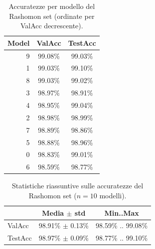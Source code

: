 \documentclass[12pt,a4paper,oneside]{report}
\numberwithin{figure}{chapter}
\numberwithin{table}{chapter}
\begin{document}
\begin{table}[H]
      \centering
      \begin{minipage}{0.90\linewidth}
            \centering
            \renewcommand{\arraystretch}{1.1}
            \setlength{\tabcolsep}{6pt}
            \begin{tabular}{rcc}
                  \hline
                  \textbf{Model} & \textbf{ValAcc} & \textbf{TestAcc} \\
                  \hline
                  9              & 99.08\%         & 99.03\%          \\
                  1              & 99.03\%         & 99.10\%          \\
                  8              & 99.03\%         & 99.02\%          \\
                  3              & 98.97\%         & 98.91\%          \\
                  4              & 98.95\%         & 99.04\%          \\
                  2              & 98.98\%         & 98.99\%          \\
                  7              & 98.89\%         & 98.86\%          \\
                  5              & 98.88\%         & 98.96\%          \\
                  0              & 98.83\%         & 99.01\%          \\
                  6              & 98.59\%         & 98.77\%          \\
                  \hline
            \end{tabular}
            \caption{Accuratezze per modello del Rashomon set (ordinate per ValAcc decrescente).}
            \label{tab:rashomon_acc_by_model}
      \end{minipage}
\end{table}

\begin{table}[H]
      \centering
      \begin{minipage}{0.70\linewidth}
            \centering
            \renewcommand{\arraystretch}{1.1}
            \begin{tabular}{lcc}
                  \hline
                          & \textbf{Media $\pm$ std} & \textbf{Min..Max}  \\
                  \hline
                  ValAcc  & 98.91\% $\pm$ 0.13\%     & 98.59\% .. 99.08\% \\
                  TestAcc & 98.97\% $\pm$ 0.09\%     & 98.77\% .. 99.10\% \\
                  \hline
            \end{tabular}
            \caption{Statistiche riassuntive sulle accuratezze del Rashomon set ($n=10$ modelli).}
            \label{tab:rashomon_acc_summary}
      \end{minipage}
\end{table}
\end{document}

